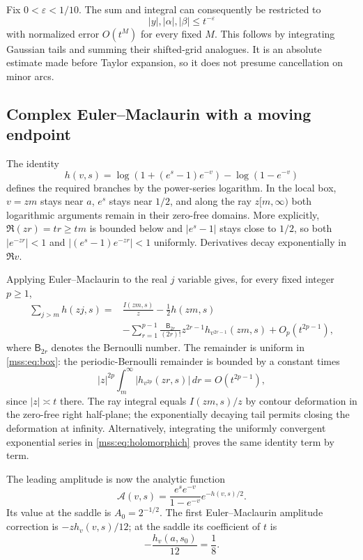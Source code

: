 \documentclass[11pt,letterpaper]{article}
\numberwithin{equation}{section}
\theoremstyle{definition}\newtheorem{definition}[theorem]{Definition}
\theoremstyle{remark}\newtheorem{remark}[theorem]{Remark}
\begin{document}
Fix $0<\varepsilon<1/10$. The sum and integral can consequently be restricted to
\begin{equation}\label{mss:eq:box}
|y|,|\alpha|,|\beta|\le t^{-\varepsilon}
\end{equation}
with normalized error $O(t^M)$ for every fixed $M$. This follows by integrating Gaussian tails and summing their shifted-grid analogues. It is an absolute estimate made before Taylor expansion, so it does not presume cancellation on minor arcs.

\subsection{Complex Euler--Maclaurin with a moving endpoint}
The identity
\begin{equation}\label{mss:eq:holomorphich}
h(v,s)=\log(1+(e^s-1)e^{-v})-\log(1-e^{-v})
\end{equation}
defines the required branches by the power-series logarithm. In the local box, $v=zm$ stays near $a$, $e^s$ stays near $1/2$, and along the ray $z[m,\infty)$ both logarithmic arguments remain in their zero-free domains. More explicitly, $\Re(zr)=tr\ge tm$ is bounded below and $|e^s-1|$ stays close to $1/2$, so both $|e^{-zr}|<1$ and $|(e^s-1)e^{-zr}|<1$ uniformly. Derivatives decay exponentially in $\Re v$.

Applying Euler--Maclaurin to the real $j$ variable gives, for every fixed integer $p\ge1$,
\begin{align}\label{mss:eq:complexEM}
\sum_{j>m}h(zj,s)
={}&\frac{I(zm,s)}z-\frac12h(zm,s)\\
&-\sum_{r=1}^{p-1}\frac{\mathsf B_{2r}}{(2r)!}
 z^{2r-1}h_{v^{2r-1}}(zm,s)+O_p(t^{2p-1}),\nonumber
\end{align}
where $\mathsf B_{2r}$ denotes the Bernoulli number. The remainder is uniform in \eqref{mss:eq:box}: the periodic-Bernoulli remainder is bounded by a constant times
\begin{equation}\label{mss:eq:EMremainder}
|z|^{2p}\int_m^\infty|h_{v^{2p}}(zr,s)|\,dr=O(t^{2p-1}),
\end{equation}
since $|z|\asymp t$ there. The ray integral equals $I(zm,s)/z$ by contour deformation in the zero-free right half-plane; the exponentially decaying tail permits closing the deformation at infinity. Alternatively, integrating the uniformly convergent exponential series in \eqref{mss:eq:holomorphich} proves the same identity term by term.

The leading amplitude is now the analytic function
\begin{equation}\label{mss:eq:amplitude}
\mathcal A(v,s)=\frac{e^s e^{-v}}{1-e^{-v}}e^{-h(v,s)/2}.
\end{equation}
Its value at the saddle is $A_0=2^{-1/2}$. The first Euler--Maclaurin amplitude correction is $-z h_v(v,s)/12$; at the saddle its coefficient of $t$ is
\begin{equation}\label{mss:eq:EMfirst}
-\frac{h_v(a,s_0)}{12}=\frac18.
\end{equation}
\end{document}
